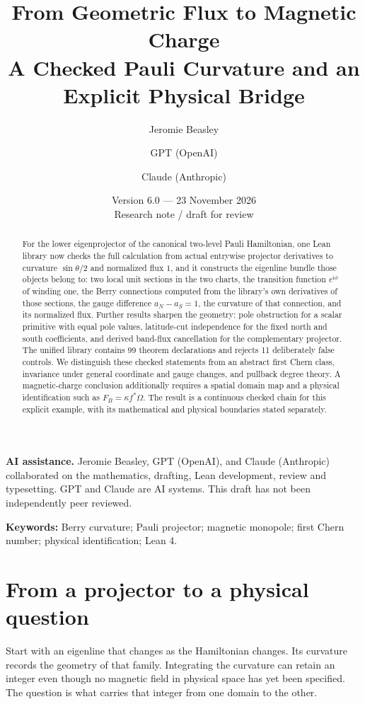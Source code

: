 \documentclass[11pt]{article}
\title{\vspace{-1.5em}From Geometric Flux to Magnetic Charge\\[0.4em]\large A Checked Pauli Curvature and an Explicit Physical Bridge}
\author{Jeromie Beasley \and GPT (OpenAI) \and Claude (Anthropic)}
\date{Version 6.0 --- 23 November 2026\\\small Research note / draft for review}
\theoremstyle{definition}\newtheorem{definition}[theorem]{Definition}
\theoremstyle{remark}\newtheorem{remark}[theorem]{Remark}
\newcommand{\ii}{\mathrm{i}}
\begin{document}
\maketitle
{\small\noindent\textbf{AI assistance.} Jeromie Beasley, GPT (OpenAI), and Claude (Anthropic) collaborated on the mathematics, drafting, Lean development, review and typesetting. GPT and Claude are AI systems. This draft has not been independently peer reviewed.\par}
\begin{abstract}
For the lower eigenprojector of the canonical two-level Pauli Hamiltonian, one Lean library now checks the full calculation from actual entrywise projector derivatives to curvature $\sin\theta/2$ and normalized flux $1$, and it constructs the eigenline bundle those objects belong to: two local unit sections in the two charts, the transition function $e^{\ii\phi}$ of winding one, the Berry connections computed from the library’s own derivatives of those sections, the gauge difference $a_N-a_S=1$, the curvature of that connection, and its normalized flux. Further results sharpen the geometry: pole obstruction for a scalar primitive with equal pole values, latitude-cut independence for the fixed north and south coefficients, and derived band-flux cancellation for the complementary projector. The unified library contains 99 theorem declarations and rejects 11 deliberately false controls. We distinguish these checked statements from an abstract first Chern class, invariance under general coordinate and gauge changes, and pullback degree theory. A magnetic-charge conclusion additionally requires a spatial domain map and a physical identification such as $F_B=\kappa f^*\Omega$. The result is a continuous checked chain for this explicit example, with its mathematical and physical boundaries stated separately.

\end{abstract}
\noindent\textbf{Keywords:} Berry curvature; Pauli projector; magnetic monopole; first Chern number; physical identification; Lean 4.

\section{From a projector to a physical question}
Start with an eigenline that changes as the Hamiltonian changes. Its curvature records the geometry of that family. Integrating the curvature can retain an integer even though no magnetic field in physical space has yet been specified. The question is what carries that integer from one domain to the other.
\end{document}
